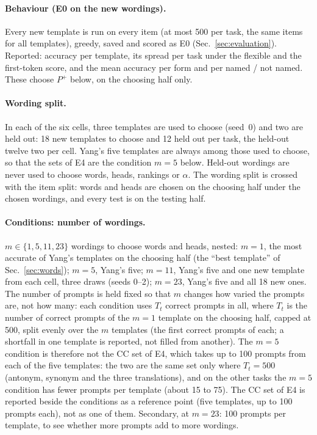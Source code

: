 \documentclass[11pt,a4paper]{article}
\begin{document}
\paragraph{Behaviour (E0 on the new wordings).} Every new template is run on every item (at
most 500 per task, the same items for all templates), greedy, saved and scored as E0
(Sec.~\ref{sec:evaluation}). Reported: accuracy per template, its spread per task under the flexible and the
first-token score, and the mean accuracy per form and per named / not named. These choose
$P^+$ below, on the choosing half only.

\paragraph{Wording split.} In each of the six cells, three templates are used to choose
(seed~0) and two are held out: 18 new templates to choose and 12 held out per task, the held-out
twelve two per cell. Yang's five templates are always among those used to choose, so that the
sets of E4 are the condition $m = 5$ below. Held-out wordings are never used to choose words,
heads, rankings or $\alpha$. The wording split is crossed with the item split: words and heads
are chosen on the choosing half under the chosen wordings, and every test is on the testing
half.

\paragraph{Conditions: number of wordings.} $m \in \{1, 5, 11, 23\}$ wordings to choose words
and heads, nested: $m = 1$, the most accurate of Yang's templates on the choosing half (the
``best template'' of Sec.~\ref{sec:words}); $m = 5$, Yang's five; $m = 11$, Yang's five and one new template
from each cell, three draws (seeds 0--2); $m = 23$, Yang's five and all 18 new ones. The number
of prompts is held fixed so that $m$ changes how varied the prompts are, not how many: each
condition uses $T_t$ correct prompts in all, where $T_t$ is the number of correct prompts of the
$m = 1$ template on the choosing half, capped at 500, split evenly over the $m$ templates (the
first correct prompts of each; a shortfall in one template is reported, not filled from
another). The $m = 5$ condition is therefore not the CC set of E4, which takes up to 100
prompts from each of the five templates: the two are the same set only where $T_t = 500$
(antonym, synonym and the three translations), and on the other tasks the $m = 5$ condition
has fewer prompts per template (about 15 to 75). The CC set of E4 is reported beside the
conditions as a reference point (five templates, up to 100 prompts each), not as one of them.
Secondary, at $m = 23$: 100 prompts per template, to see
whether more prompts add to more wordings.
\end{document}

